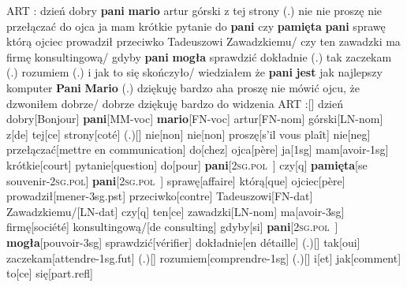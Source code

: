 \documentclass[12pt,a4paper,french]{book}
\newcommand{\pv}{\textsc{2sg.pol}}
\begin{document}

\ex[everyglpreamble=\tt,glhangstyle=none,glspace=1.5em minus .5em,
   glnabovelineskip={,-6pt},glrightskip=0pt plus 10em]
%
\raggedbottom
\begingl
\glpreamble
ART : dzień dobry \\{pani} \\{mario} artur
górski z tej strony (.) nie nie proszę nie przełączać do ojca ja mam
krótkie pytanie do \\{pani} czy \\{pamięta} \\{pani}
sprawę którą ojciec prowadził przeciwko Tadeuszowi Zawadzkiemu/ czy ten
zawadzki ma firmę konsultingową/ gdyby \\{pani} \\{mogła}
sprawdzić dokładnie (.) tak zaczekam (.) rozumiem (.) i jak to się
skończyło/ wiedziałem że \\{pani} \\{jest} jak najlepszy
komputer \\{Pani} \\{Mario} (.) dziękuję bardzo aha proszę
nie mówić ojcu, że dzwoniłem dobrze/ dobrze dziękuję bardzo do widzenia
\endpreamble
{ART :}[{}]   {dzień dobry}[Bonjour]   \\{pani}[MM-{\sc voc}]
\\{mario}[FN-{\sc voc}]   artur[FN-{\sc nom}]   górski[LN-{\sc nom}]
z[de] tej[ce]   strony[coté]   {(.)}[{}]   nie[non]   nie[non]
proszę[{s'il vous plaît}]   nie[{\sc neg}]
przełączać[{mettre en communication}]   do[chez]
ojca[père] ja[{\sc 1sg}]   mam[avoir-{\sc 1sg}]   krótkie[court]
pytanie[question]   do[pour]   \\{pani}[\pv~]   czy[{\sc q}]
\\{pamięta}[{se souvenir-\pv}]   \\{pani}[\pv~]
sprawę[affaire]   którą[que]   ojciec[père]
prowadził[mener-{\sc 3sg.pst}]   przeciwko[contre]   Tadeuszowi[FN-{\sc dat}]
Zawadzkiemu/[LN-{\sc dat}]   czy[{\sc q}]   ten[ce]   zawadzki[LN-{\sc nom}]
ma[avoir-{\sc 3sg}]   firmę[société]   konsultingową/[{de consulting}]
gdyby[si]   \\{pani}[\pv~]   \\{mogła}[pouvoir-{\sc 3sg}]
sprawdzić[vérifier]   dokładnie[{en détaille}]   {(.)}[{}]   tak[oui]
zaczekam[attendre-{\sc 1sg.fut}]   {(.)}[{}] rozumiem[comprendre-{\sc 1sg}]
{(.)}[{}]   i[et]   jak[comment]   to[ce]   się[{\sc part.refl}]
\end{document}
